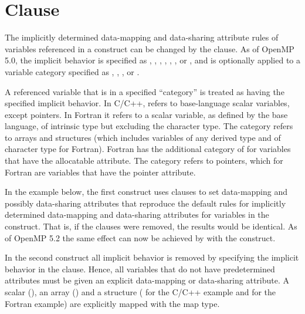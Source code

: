 \section{ Clause}
\label{sec:defaultmap}

The implicitly determined data-mapping and data-sharing attribute
rules of variables referenced in a  construct can be
changed by the  clause. 
As of OpenMP 5.0, the implicit behavior is specified as
, , , ,
, ,  or ,
and is optionally applied to a variable category specified as , , ,
or . 

A referenced variable that is in a specified ``category'' is treated as having
the specified implicit behavior. In C/C++,  refers to
base-language scalar variables, except pointers.  In Fortran it refers to a
scalar variable, as defined by the base language, of intrinsic type but
excluding the character type. The  category refers to arrays and
structures (which includes variables of any derived type and of character type for Fortran). Fortran
has the additional category of  for variables that have the
allocatable attribute. The  category refers to pointers, which
for Fortran are variables that have the pointer attribute.

In the example below, the first  construct uses  
clauses to set data-mapping and possibly data-sharing attributes that reproduce 
the default rules for implicitly determined data-mapping and data-sharing
attributes for variables in the construct. That is, if the 
clauses were removed, the results would be identical. As of OpenMP 5.2 
the same effect can now be achieved by  with 
the  construct.

In the second  construct all implicit behavior is removed
by specifying the  implicit behavior in the  clause.
Hence, all variables that do not have predetermined attributes must be given an
explicit data-mapping or data-sharing attribute. A scalar (), an
array () and a structure ( for the C/C++ example and
 for the Fortran example) are explicitly mapped with the
 map type.

